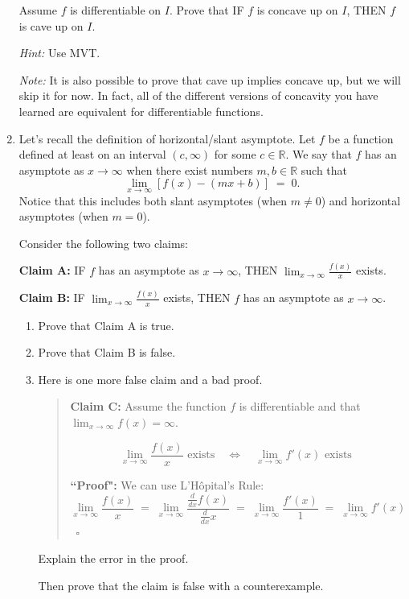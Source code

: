 \documentclass[12pt]{exam}
\newcommand {\DS} [1] {${\displaystyle #1}$}
\newcommand{\vv}{\vspace{.1cm}}
\newcommand{\R}{\mathbb{R}}
\begin{document}
\begin{enumerate}
 Assume $f$ is differentiable on $I$. 
		Prove that IF $f$ is concave up on $I$, THEN $f$ is cave up on $I$.


\emph{Hint:}  Use MVT.

\emph{Note:}  It is also possible to prove that cave up implies concave up, but we will skip it for now.  In fact, all of the different versions of concavity you have learned are equivalent for differentiable functions.	

\vv

\item  Let's recall the definition of horizontal/slant asymptote.  Let $f$ be a function defined at least on an interval $(c,\infty)$ for some $c \in \R$.
We say that $f$ has an asymptote as $x \to \infty$ when there exist numbers $m, b \in \R$ such that
	$$	
		\lim_{x \to \infty} \left[ f(x) - \left( mx + b \right) \right] \; = \; 0.
	$$
Notice that this includes both slant asymptotes (when $m \neq 0$) and horizontal asymptotes (when $m =0$).
	
Consider the following two claims:	
			\begin{center}
				{\bf Claim A:} \quad \quad
					IF $f$ has an asymptote as $x \to \infty$,  \quad
					THEN \DS{\lim_{x \to \infty} \frac{f(x)}{x}} exists.
				
				{\bf Claim B:} \quad \quad 		
					IF \DS{\lim_{x \to \infty} \frac{f(x)}{x}} exists, \quad
					THEN $f$ has an asymptote as $x \to \infty$.
			\end{center}
	\begin{enumerate}
		\item Prove that Claim A is true.
		\item Prove that Claim B is false.

		\item  Here is one more false claim and a bad proof.
			\begin{quotation}
				\noindent
				{\bf Claim C:} Assume the function $f$ is differentiable and that \DS{\lim_{x \to \infty} f(x) = \infty}.
				
				$$  \lim_{x \to \infty} \frac{f(x)}{x} \mbox{ exists} \quad \iff \quad \lim_{x \to \infty} f'(x) \mbox{ exists } $$
				
				
				\noindent
				{\bf ``Proof":}  We can use L'H\^{o}pital's Rule:
					$$
						\lim_{x \to \infty} \frac{f(x)}{x} \; = \; \lim_{x \to \infty} \frac{\frac{d}{dx} f(x)}{\frac{d}{dx} x} 
							\; = \; \lim_{x \to \infty} \frac{f'(x)}{1} \; = \; \lim_{x \to \infty} f'(x)
					$$
					\ \hfill $\square$
			\end{quotation}
			Explain the  error in the proof.
			
			Then prove that the claim is false with a counterexample.
	\end{enumerate}

\end{enumerate}
\end{document}
